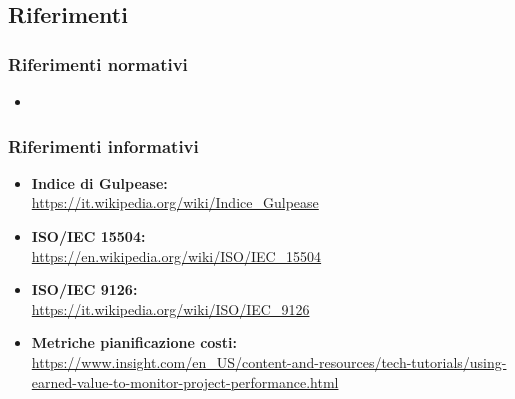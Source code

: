 \subsection{Riferimenti}

\subsubsection{Riferimenti normativi}
\begin{itemize}
	\item {}
\end{itemize}

\subsubsection{Riferimenti informativi}
\sloppy
\begin{itemize}
	\item \textbf{Indice di Gulpease:}\\
	\url{https://it.wikipedia.org/wiki/Indice_Gulpease}
	\item \textbf{ISO/IEC 15504:}\\
	\url{https://en.wikipedia.org/wiki/ISO/IEC_15504}
	\item \textbf{ISO/IEC 9126:}\\
	\url{https://it.wikipedia.org/wiki/ISO/IEC_9126}
	\item \textbf{Metriche pianificazione costi:}\\
	\url{https://www.insight.com/en_US/content-and-resources/tech-tutorials/using-earned-value-to-monitor-project-performance.html}
\end{itemize}
\fussy